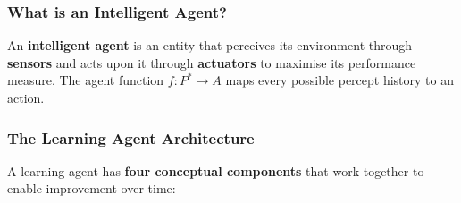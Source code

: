 \documentclass[12pt, a4paper]{article}
\begin{document}
\subsubsection*{What is an Intelligent Agent?}

\noindent An \textbf{intelligent agent} is an entity that perceives its environment through \textbf{sensors} and acts upon it through \textbf{actuators} to maximise its performance measure. The agent function $f: P^* \to A$ maps every possible percept history to an action.

\subsubsection*{The Learning Agent Architecture}

\noindent A learning agent has \textbf{four conceptual components} that work together to enable improvement over time:
\end{document}
